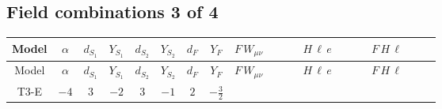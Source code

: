 \documentclass[8pt]{article}
\begin{document}
\begin{landscape}
\subsection*{Field combinations 3 of 4}
\begin{longtable}{@{}cccccccc >{\raggedright\arraybackslash}p{0.21\linewidth} >{\raggedright\arraybackslash}p{0.21\linewidth} >{\raggedright\arraybackslash}p{0.21\linewidth}@{}}
\toprule
Model & $\alpha$ & $d_{S_1}$ & $Y_{S_1}$ & $d_{S_2}$ & $Y_{S_2}$ & $d_F$ & $Y_F$ & $F\,W_{\mu\nu}$ & $H\,\ell\,e$ & $F\,H\,\ell$ \\
\midrule
\endfirsthead
\toprule
Model & $\alpha$ & $d_{S_1}$ & $Y_{S_1}$ & $d_{S_2}$ & $Y_{S_2}$ & $d_F$ & $Y_F$ & $F\,W_{\mu\nu}$ & $H\,\ell\,e$ & $F\,H\,\ell$ \\
\midrule
\endhead
T3-E & $-4$ & $3$ & $-2$ & $3$ & $-1$ & $2$ & $-\frac{3}{2}$ & \scriptsize\adjustbox{max width=\linewidth}{$\begin{gathered} -\frac{1}{2} \hbar  \log \left(\frac{\bar{\mu}^{2}}{M_F^2}\right) \left(W_{\mu _1\mu _2}^{A_1}\right){}^2\end{gathered}$} & \scriptsize\adjustbox{max width=\linewidth}{$\begin{gathered} +\frac{\sqrt{3} \hbar  \overline{y_{1,i_3,r_1}} \overline{L_{a_1,i_2}}\, P_R\, e_{i_1} H_{a_1} y_{1,i_2,r_1} Y_{e,i_3,i_1}}{4 \epsilon } \\ -\frac{1}{8} \sqrt{3} \hbar  \overline{y_{1,i_3,r_1}} \overline{L_{a_1,i_2}}\, P_R\, e_{i_1} H_{a_1} y_{1,i_2,r_1} Y_{e,i_3,i_1} \\ +\frac{\sqrt{3} \hbar  \overline{y_{2,i_3,r_1}} \overline{L_{a_1,i_2}}\, P_R\, e_{i_1} H_{a_1} y_{2,i_2,r_1} Y_{e,i_3,i_1}}{4 \epsilon }\end{gathered}$} & \scriptsize\adjustbox{max width=\linewidth}{$\begin{gathered} -\frac{2 \sqrt{\frac{2}{3}} \hbar  \log \left(\frac{M_F^2}{m_2^2}\right) \overline{y_{1,i_1,r_1}} \overline{y_{2,i_2,r_1}} L_{a_4,i_2}{}^T\, C\, P_L\, L_{a_2,i_1} H_{a_1} H_{a_3} m_2^2 \lambda_5 \epsilon_{a_1,a_2} \epsilon_{a_3,a_4} M_F^3}{\left(M_F^2-m_1^2\right) \left(M_F^2-m_2^2\right) \left(m_1^2-m_2^2\right)} \\ +\frac{2 \sqrt{\frac{2}{3}} \hbar  \log \left(\frac{M_F^2}{m_1^2}\right) \overline{y_{1,i_1,r_1}} \overline{y_{2,i_2,r_1}} L_{a_4,i_2}{}^T\, C\, P_L\, L_{a_2,i_1} H_{a_1} H_{a_3} m_1^2 \lambda_5 \epsilon_{a_1,a_2} \epsilon_{a_3,a_4} M_F^3}{\left(M_F^2-m_1^2\right) \left(M_F^2-m_2^2\right) \left(m_1^2-m_2^2\right)} \\ -\frac{2 \sqrt{\frac{2}{3}} \hbar  \log \left(\frac{M_F^2}{m_2^2}\right) \overline{\lambda_5} \overline{L_{a_3,i_1}}\, C\, P_R\, \overline{L_{a_4,i_2}}{}^T m_2^2 y_{1,i_1,r_1} y_{2,i_2,r_1} \epsilon_{a_1,a_3} \epsilon_{a_2,a_4} H_{a_1}{}^{\dagger } H_{a_2}{}^{\dagger } M_F^3}{\left(M_F^2-m_1^2\right) \left(M_F^2-m_2^2\right) \left(m_1^2-m_2^2\right)}\end{gathered}$} \\

\end{longtable}
\end{landscape}
\end{document}
